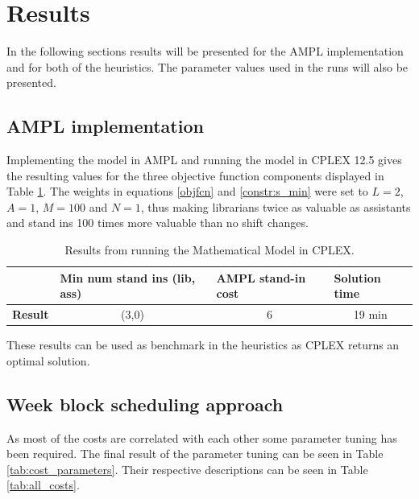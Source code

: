 \section{Results}
In the following sections results will be presented for the AMPL implementation and for both of the heuristics. The parameter values used in the runs will also be presented. 

\subsection{AMPL implementation}\label{sec:ampl_res}

Implementing the model in AMPL and running the model in CPLEX 12.5 gives the resulting values for the three objective function components displayed in Table \ref{tab:CPLEX_res}. The weights in equations \ref{objfcn} and \ref{constr:s_min} were set to $L = 2$, $A = 1$, $M =100$ and $N=1$, thus making librarians twice as valuable as assistants and stand ins 100 times more valuable than no shift changes. 

\begin{table}[!h]
\centering
\caption{Results from running the Mathematical Model in CPLEX.}
\label{tab:CPLEX_res}
\begin{tabular}{|l|p{3cm}|p{3cm}|l|}
\hline
\rowcolor{Gray} & \textbf{Min num stand ins (lib, ass)} & \textbf{AMPL stand-in cost} & \textbf{Solution time} \\ \hline
\cellcolor{Gray} \textbf{Result} & \multicolumn{1}{c|}{(3,0)} & \multicolumn{1}{c|}{6} & \multicolumn{1}{c|}{19 min} \\
\hline
\end{tabular}
\end{table}

These results can be used as benchmark in the heuristics as CPLEX returns an optimal solution. 

\subsection{Week block scheduling approach}
As most of the costs are correlated with each other some parameter tuning has been required. The final result of the parameter tuning can be seen in Table \ref{tab:cost_parameters}. Their respective descriptions can be seen in Table \ref{tab:all_costs}. 

